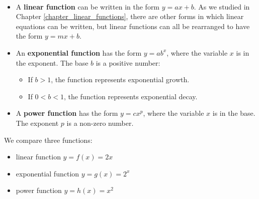 \begin{summarybox}
    ~\\
    \begin{itemize}
        \item A \textbf{linear function} can be written in the form \( y = ax + b \). As we studied in Chapter \ref{chapter_linear_functions}, there are other forms in which linear equations can be written, but linear functions can all be rearranged to have the form \( y = mx + b \).
        \item An \textbf{exponential function} has the form \( y = ab^x \), where the variable \( x \) is in the exponent. The base \( b \) is a positive number:
              \begin{itemize}
                  \item If \( b > 1 \), the function represents exponential growth.
                  \item If \( 0 < b < 1 \), the function represents exponential decay.
              \end{itemize}
        \item A \textbf{power function} has the form \( y = cx^p \), where the variable \( x \) is in the base. The exponent \( p \) is a non-zero number.

    \end{itemize}
\end{summarybox}

We compare three functions:
\begin{itemize}
    \item linear function \( y = f(x) = 2x \)
    \item exponential function \( y = g(x) = 2^x \)
    \item power function \( y = h(x) = x^2 \)
\end{itemize}

